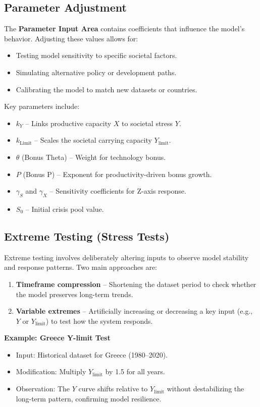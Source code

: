 \documentclass[12pt,a4paper]{article}
\begin{document}
\subsection{Parameter Adjustment}
The \textbf{Parameter Input Area} contains coefficients that influence the model’s behavior.  
Adjusting these values allows for:
\begin{itemize}
    \item Testing model sensitivity to specific societal factors.
    \item Simulating alternative policy or development paths.
    \item Calibrating the model to match new datasets or countries.
\end{itemize}

\noindent
Key parameters include:
\begin{itemize}
    \item \(k_Y\) – Links productive capacity \(X\) to societal stress \(Y\).
    \item \(k_{\text{Limit}}\) – Scales the societal carrying capacity \(Y_{\text{limit}}\).
    \item \(\theta\) (Bonus Theta) – Weight for technology bonus.
    \item \(P\) (Bonus P) – Exponent for productivity-driven bonus growth.
    \item \(\gamma_S\) and \(\gamma_X\) – Sensitivity coefficients for Z-axis response.
    \item \(S_0\) – Initial crisis pool value.
\end{itemize}

\subsection{Extreme Testing (Stress Tests)}
Extreme testing involves deliberately altering inputs to observe model stability and response patterns.
Two main approaches are:
\begin{enumerate}
    \item \textbf{Timeframe compression} – Shortening the dataset period to check whether the model preserves long-term trends.
    \item \textbf{Variable extremes} – Artificially increasing or decreasing a key input (e.g., \(Y\) or \(Y_{\text{limit}}\)) to test how the system responds.
\end{enumerate}

\noindent
\textbf{Example: Greece Y-limit Test}
\begin{itemize}
    \item Input: Historical dataset for Greece (1980–2020).
    \item Modification: Multiply \(Y_{\text{limit}}\) by 1.5 for all years.
    \item Observation: The \(Y\) curve shifts relative to \(Y_{\text{limit}}\) without destabilizing the long-term pattern, confirming model resilience.
\end{itemize}
\end{document}
